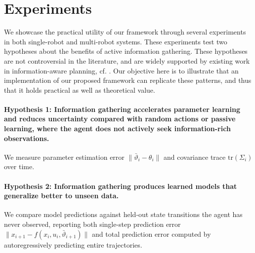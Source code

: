 \section{Experiments}
\label{sec:contribution4}

We showcase the practical utility of our framework through several experiments in both single-robot and multi-robot systems. 
These experiments test two hypotheses about the benefits of active information gathering.
These hypotheses are not controversial in the literature, and are widely supported by existing work in information-aware planning, cf. \cite{davydov2024first,lew2022safe,harrison2024variational,harrison2020meta,hu2024active}.
Our objective here is to illustrate that an implementation of our proposed framework can replicate these patterns, and thus that it holds practical as well as theoretical value.

\paragraph{Hypothesis 1: Information gathering accelerates parameter learning and reduces uncertainty compared with random actions or passive learning, where the agent does not actively seek information-rich observations.}
We measure parameter estimation error $\|\bar{\vartheta}_i - \theta_i\|$ and covariance trace $\text{tr}(\Sigma_i)$ over time.

\paragraph{Hypothesis 2: Information gathering produces learned models that generalize better to unseen data.}
We compare model predictions against held-out state transitions the agent has never observed, reporting both single-step prediction error $\|x_{i+1} - f(x_i, u_i, \bar{\vartheta}_{i+1})\|$ and total prediction error computed by autoregressively predicting entire trajectories.



